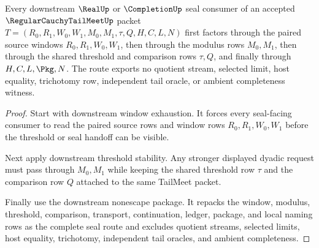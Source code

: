\begin{theorem}
\label{thm:regular-cauchy-tail-meet-root-downstream-seal-route}
Every downstream $\RealUp$ or $\CompletionUp$ seal consumer of an accepted
$\RegularCauchyTailMeetUp$ packet
$T=(R_0,R_1,W_0,W_1,M_0,M_1,\tau,Q,H,C,L,N)$ first factors through the paired
source windows $R_0,R_1,W_0,W_1$, then through the modulus rows $M_0,M_1$, then
through the shared threshold and comparison rows $\tau,Q$, and finally through
$H,C,L,\Pkg,N$. The route exports no quotient stream, selected limit, host
equality, trichotomy row, independent tail oracle, or ambient completeness
witness.
\end{theorem}
\begin{proof}
Start with downstream window exhaustion. It forces every seal-facing consumer to
read the paired source rows and window rows $R_0,R_1,W_0,W_1$ before the
threshold or seal handoff can be visible.

Next apply downstream threshold stability. Any stronger displayed dyadic request
must pass through $M_0,M_1$ while keeping the shared threshold row $\tau$ and the
comparison row $Q$ attached to the same TailMeet packet.

Finally use the downstream nonescape package. It repacks the window,
modulus, threshold, comparison, transport, continuation, ledger, package, and
local naming rows as the complete seal route and excludes quotient streams,
selected limits, host equality, trichotomy, independent tail oracles, and
ambient completeness.
\end{proof}

